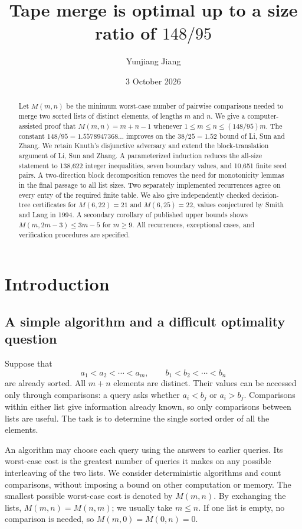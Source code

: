 \documentclass[11pt]{article}
\title{Tape merge is optimal up to a size ratio of $148/95$}
\author{Yunjiang Jiang}
\date{3 October 2026}
\theoremstyle{definition}
\theoremstyle{remark}
\begin{document}
\maketitle
\begin{abstract}
Let $M(m,n)$ be the minimum worst-case number of pairwise comparisons needed
to merge two sorted lists of distinct elements, of lengths $m$ and $n$.
We give a computer-assisted proof that $M(m,n)=m+n-1$ whenever
$1\le m\le n\le(148/95)m$.
The constant $148/95=1.5578947368\ldots$ improves on the $38/25=1.52$
bound of Li, Sun and Zhang.
We retain Knuth's disjunctive adversary and extend the block-translation
argument of Li, Sun and Zhang. A parameterized induction reduces the
all-size statement to 138,622 integer inequalities, seven boundary values,
and 10,651 finite seed pairs. A two-direction block decomposition removes
the need for monotonicity lemmas in the final passage to all list sizes.
Two separately implemented recurrences agree on every entry of the required
finite table. We also give independently checked decision-tree certificates
for $M(6,22)=21$ and $M(6,25)=22$, values conjectured by Smith and Lang in 1994.
A secondary corollary of published upper bounds shows
$M(m,2m-3)\le3m-5$ for $m\ge9$.
All recurrences, exceptional cases, and verification procedures are specified.
\end{abstract}
\tableofcontents

\section{Introduction}
\label{sec:introduction}

\subsection{A simple algorithm and a difficult optimality question}
Suppose that
\[
 a_1<a_2<\cdots<a_m,\qquad b_1<b_2<\cdots<b_n
\]
are already sorted. All $m+n$ elements are distinct. Their values can be
accessed only through comparisons: a query asks whether $a_i<b_j$ or
$a_i>b_j$. Comparisons within either list give information already known,
so only comparisons between lists are useful. The task is to determine the
single sorted order of all the elements.

An algorithm may choose each query using the answers to earlier queries.
Its worst-case cost is the greatest number of queries it makes on any
possible interleaving of the two lists. We consider deterministic algorithms
and count comparisons, without imposing a bound on other computation or
memory. The smallest possible worst-case cost is denoted by $M(m,n)$.
By exchanging the lists, $M(m,n)=M(n,m)$; we usually take $m\le n$.
If one list is empty, no comparison is needed, so $M(m,0)=M(0,n)=0$.
\end{document}
